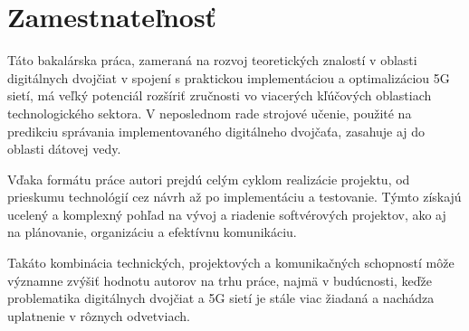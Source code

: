 \section{Zamestnateľnosť}
\par{
Táto bakalárska práca, zameraná na rozvoj teoretických znalostí v oblasti digitálnych dvojčiat v spojení s praktickou implementáciou a optimalizáciou 5G sietí, má veľký potenciál rozšíriť zručnosti vo viacerých kľúčových oblastiach technologického sektora. V neposlednom rade strojové učenie, použité na predikciu správania implementovaného digitálneho dvojčaťa, zasahuje aj do oblasti dátovej vedy.

Vďaka formátu práce autori prejdú celým cyklom realizácie projektu, od prieskumu technológií cez návrh až po implementáciu a testovanie. Týmto získajú ucelený a komplexný pohľad na vývoj a riadenie softvérových projektov, ako aj na plánovanie, organizáciu a efektívnu komunikáciu.

Takáto kombinácia technických, projektových a komunikačných schopností môže významne zvýšiť hodnotu autorov na trhu práce, najmä v budúcnosti, keďže problematika digitálnych dvojčiat a 5G sietí je stále viac žiadaná a nachádza uplatnenie v rôznych odvetviach.
}